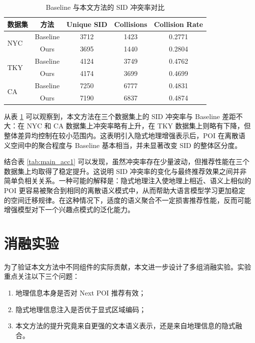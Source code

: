 \begin{table}[htbp]
\centering
\caption{Baseline 与本文方法的 SID 冲突率对比}
\label{tab:collision_rate}
\begin{tabular}{lcccc}
\toprule
数据集 & 方法 & Unique SID & Collisions & Collision Rate \\
\midrule
\multirow{2}{*}{NYC}
& Baseline & 3712 & 1423 & 0.2771 \\
& Ours & 3695 & 1440 & 0.2804 \\
\midrule
\multirow{2}{*}{TKY}
& Baseline & 4124 & 3749 & 0.4762 \\
& Ours & 4174 & 3699 & 0.4699 \\
\midrule
\multirow{2}{*}{CA}
& Baseline & 7250 & 6777 & 0.4831 \\
& Ours & 7190 & 6837 & 0.4874 \\
\bottomrule
\end{tabular}
\end{table}

从表 \ref{tab:collision_rate} 可以观察到，本文方法在三个数据集上的 SID 冲突率与 Baseline 差距不大：在 NYC 和 CA 数据集上冲突率略有上升，在 TKY 数据集上则略有下降，但整体差异均控制在较小范围内。这表明引入隐式地理增强表示后，POI 在离散语义空间中的聚合程度与 Baseline 基本相当，并未显著改变 SID 的整体区分度。

结合表 \ref{tab:main_acc1} 可以发现，虽然冲突率存在少量波动，但推荐性能在三个数据集上均取得了稳定提升。这说明 SID 冲突率的变化与最终推荐效果之间并非简单负相关关系。一种可能的解释是：隐式地理注入使地理上相近、语义上相似的 POI 更容易被聚合到相同的离散语义模式中，从而帮助大语言模型学习更加稳定的空间迁移规律。在这种情况下，适度的语义聚合不一定损害推荐性能，反而可能增强模型对下一个兴趣点模式的泛化能力。


\section{消融实验}
\label{sec:ablation}

为了验证本文方法中不同组件的实际贡献，本文进一步设计了多组消融实验。实验重点关注以下三个问题：

\begin{enumerate}
    \item 地理信息本身是否对 Next POI 推荐有效；
    \item 隐式地理信息注入是否优于显式区域编码；
    \item 本文方法的提升究竟来自更强的文本语义表示，还是来自地理信息的隐式融合。
\end{enumerate}

